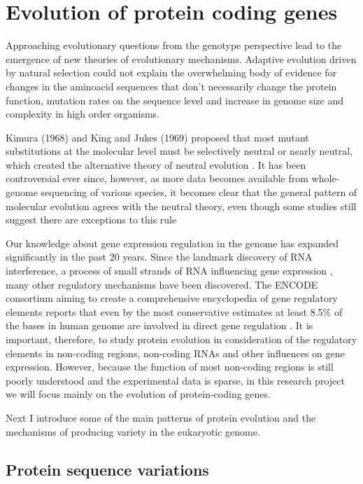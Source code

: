 \documentclass[11pt, a4paper,oneside]{report}
\begin{document}
\section{Evolution of protein coding genes}
 Approaching evolutionary questions from the genotype perspective lead to the emergence of new theories of evolutionary mechanisms. Adaptive evolution driven by natural selection could not explain the overwhelming body of evidence for changes in the aminoacid sequences that don't necessarily change the protein function, mutation rates on the sequence level and increase in genome size and complexity in high order organisms. 
 
 Kimura (1968) and King and Jukes (1969) proposed that most mutant substitutions at the molecular level must be selectively neutral or nearly neutral, which created the alternative theory of neutral evolution \cite{Kimura1968,King1969}. It has been controversial ever since, however, as more data becomes available from whole-genome sequencing of various species, it becomes clear that the general pattern of molecular evolution agrees with the neutral theory, even though some studies still suggest there are exceptions to this
rule \cite{Haygood2007,Nielsen2007,Akey2009}  

Our knowledge about gene expression regulation in the genome has expanded significantly in the past 20 years. Since the landmark discovery of RNA interference, a process of small strands of RNA influencing gene expression \cite{Fire1998}, many other regulatory mechanisms have been discovered.  The ENCODE consortium aiming to create a comprehensive encyclopedia of gene regulatory elements reports that even by the most conservative estimates at least 8.5\% of the bases in human genome are involved in direct gene 
regulation \cite{Bernstein2012}. It is important, therefore, to study protein evolution in consideration of the regulatory elements in non-coding regions, non-coding RNAs and other influences on gene expression. However, because the function of most non-coding regions is still poorly understood and the experimental data is sparse, in this research project we will focus mainly on the evolution of protein-coding genes. 

Next I introduce some of the main patterns of protein evolution and the mechanisms of producing variety in the eukaryotic genome. 

\subsection{Protein sequence variations}
\end{document}
